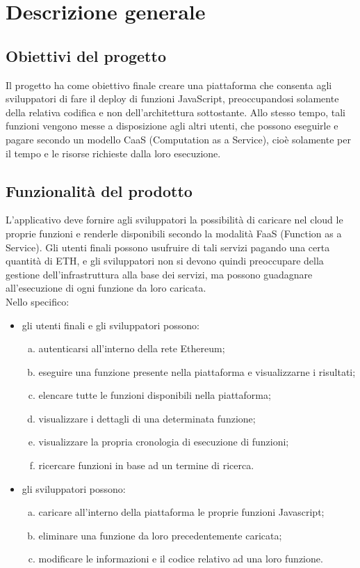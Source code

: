 \section{Descrizione generale}

\subsection{Obiettivi del progetto}
Il progetto \NomeProgetto{} ha come obiettivo finale creare una piattaforma che consenta agli sviluppatori di fare il deploy di funzioni JavaScript, preoccupandosi solamente della relativa codifica e non dell'architettura sottostante. Allo stesso tempo, tali funzioni vengono messe a disposizione agli altri utenti, che possono eseguirle e pagare secondo un modello CaaS (Computation as a Service), cioè solamente per il tempo e le risorse richieste dalla loro esecuzione.

\subsection{Funzionalità del prodotto}
L'applicativo deve fornire agli sviluppatori la possibilità di caricare nel cloud le proprie funzioni e renderle disponibili secondo la modalità FaaS (Function as a Service). Gli utenti finali possono usufruire di tali servizi pagando una certa quantità di ETH, e gli sviluppatori non si devono quindi preoccupare della gestione dell'infrastruttura alla base dei servizi, ma possono guadagnare all'esecuzione di ogni funzione da loro caricata. \\
Nello specifico: 
	\begin{itemize}
		\item gli utenti finali e gli sviluppatori possono:
		\begin{enumerate}[a.]
			\item autenticarsi all'interno della rete Ethereum;
			\item eseguire una funzione presente nella piattaforma e visualizzarne i risultati;
			\item elencare tutte le funzioni disponibili nella piattaforma;
			\item visualizzare i dettagli di una determinata funzione;
			\item visualizzare la propria cronologia di esecuzione di funzioni;
			\item ricercare funzioni in base ad un termine di ricerca.
		\end{enumerate}

		\item gli sviluppatori possono:
		\begin{enumerate}[a.]
			\item caricare all'interno della piattaforma le proprie funzioni Javascript;
			\item eliminare una funzione da loro precedentemente caricata;
			\item modificare le informazioni e il codice relativo ad una loro funzione.
		\end{enumerate}
	\end{itemize}
